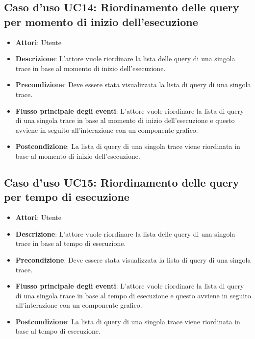\subsection{Caso d'uso UC14: Riordinamento delle query per momento di inizio dell'esecuzione}
\begin{itemize}
	\item \textbf{Attori}: Utente
	\item \textbf{Descrizione}: L'attore vuole riordinare la lista delle query di una singola trace in base al momento di inizio dell'esecuzione.
	\item \textbf{Precondizione}: Deve essere stata visualizzata la lista di query di una singola trace.
	\item \textbf{Flusso principale degli eventi}: L'attore vuole riordinare la lista di query di una singola trace in base al momento di inizio dell'esecuzione e questo avviene in seguito all'interazione con un componente grafico.
	\item \textbf{Postcondizione}: La lista di query di una singola trace viene riordinata in base al momento di inizio dell'esecuzione.
\end{itemize}

 \hypertarget{UC15}{}
\subsection{Caso d'uso UC15: Riordinamento delle query per tempo di esecuzione}
\begin{itemize}
	\item \textbf{Attori}: Utente
	\item \textbf{Descrizione}: L'attore vuole riordinare la lista delle query di una singola trace in base al tempo di esecuzione.
	\item \textbf{Precondizione}: Deve essere stata visualizzata la lista di query di una singola trace.
	
	\item \textbf{Flusso principale degli eventi}: L'attore vuole riordinare la lista di query di una singola trace in base al tempo di esecuzione e questo avviene in seguito all'interazione con un componente grafico.
	\item \textbf{Postcondizione}: La lista di query di una singola trace viene riordinata in base al tempo di esecuzione.
\end{itemize}
